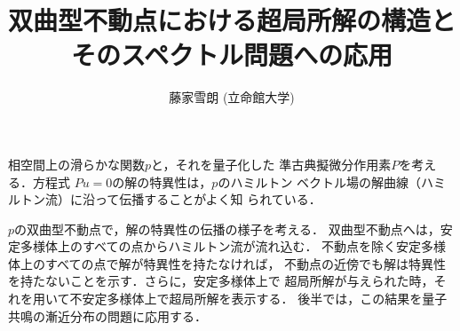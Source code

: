 \documentclass[a4paper,12pt]{article}
\title{双曲型不動点における超局所解の構造と\\そのスペクトル問題への応用}
\author{藤家雪朗 (立命館大学)}
\theoremstyle{definition}
\begin{document}
\date{}


\maketitle

\thispagestyle{empty}

相空間上の滑らかな関数$p$と，それを量子化した
準古典擬微分作用素$P$を考える．方程式
$Pu=0$の解の特異性は，$p$のハミルトン
ベクトル場の解曲線（ハミルトン流）に沿って伝播することがよく知
られている．

$p$の双曲型不動点で，解の特異性の伝播の様子を考える．
双曲型不動点へは，安定多様体上のすべての点からハミルトン流が流れ込む．
不動点を除く安定多様体上のすべての点で解が特異性を持たなければ，
不動点の近傍でも解は特異性を持たないことを示す．さらに，安定多様体上で
超局所解が与えられた時，それを用いて不安定多様体上で超局所解を表示する．
後半では，この結果を量子共鳴の漸近分布の問題に応用する．
\end{document}
